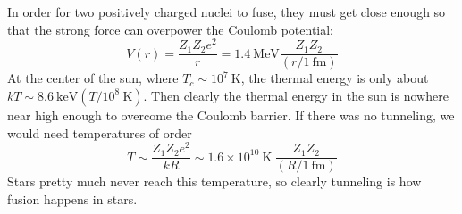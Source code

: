 \documentclass[10pt]{article}
\numberwithin{equation}{section}
\begin{document}
  In order for two positively charged nuclei to fuse, they must get
  close enough so that the strong force can overpower the Coulomb
  potential:
  \begin{equation}
    \label{eq:100}
    V(r)=\frac{Z_1Z_2 e^2}{r}=1.4\ \mathrm{MeV}\frac{Z_1Z_2}{(r/1\ \mathrm{fm})}
  \end{equation}
  At the center of the sun, where $T_c\sim 10^7\ \mathrm{K}$, the
  thermal energy is only about $kT\sim 8.6\ \mathrm{keV}\left(T/10^8\
    \mathrm{K}\right)$. Then clearly the thermal energy in the sun is
  nowhere near high enough to overcome the Coulomb barrier. If there
  was no tunneling, we would need temperatures of order 
  \begin{equation}
    \label{eq:101}
    T\sim\frac{Z_1Z_2e^2}{kR}\sim1.6\times 10^{10}\ \mathrm{K}\
    \frac{Z_1Z_2}{(R/1\ \mathrm{fm})}
  \end{equation}
  Stars pretty much never reach this temperature, so clearly tunneling
  is how fusion happens in stars.\\
\end{document}

